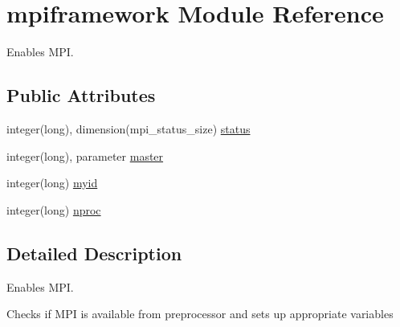 \hypertarget{classmpiframework}{\section{mpiframework Module Reference}
\label{classmpiframework}
}


Enables M\+P\+I.  


\subsection*{Public Attributes}
\begin{DoxyCompactItemize}
\item 
integer(long), dimension(mpi\+\_\+status\+\_\+size) \hyperlink{classmpiframework_ab7c6b211b6d67a29e8b7e2cefe97d5b2}{status}
\item 
integer(long), parameter \hyperlink{classmpiframework_ae3cf75bc4150b05cabe037cf7478d4a0}{master}
\item 
integer(long) \hyperlink{classmpiframework_ae833a6cbdc45698ffa99a650f0e6bb2d}{myid}
\item 
integer(long) \hyperlink{classmpiframework_af70b38210cb3bcccdc873618ffb3de35}{nproc}
\end{DoxyCompactItemize}


\subsection{Detailed Description}
Enables M\+P\+I. 

Checks if M\+P\+I is available from preprocessor and sets up appropriate variables 


